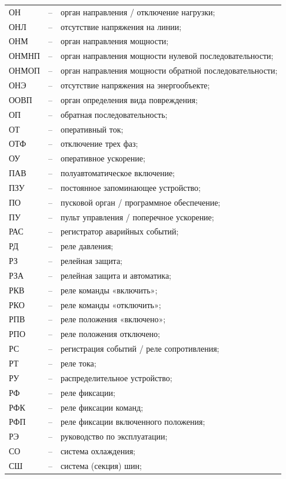 \begin{longtable}{>{\raggedright\arraybackslash}m{2cm}>{\raggedright\arraybackslash}m{0.5cm}>{\raggedright\arraybackslash}m{20cm}}
ОН & -- & орган направления / отключение нагрузки; \\
ОНЛ & -- & отсутствие напряжения на линии; \\
ОНМ & -- & орган направления мощности; \\
ОНМНП & -- & орган направления мощности нулевой последовательности; \\
ОНМОП & -- & орган направления мощности обратной последовательности; \\
ОНЭ & -- & отсутствие напряжения на энергообъекте; \\
ООВП & -- & орган определения вида повреждения; \\
ОП & -- & обратная последовательность; \\
ОТ & -- & оперативный ток; \\
ОТФ & -- & отключение трех фаз; \\
ОУ & -- & оперативное ускорение; \\
ПАВ & -- & полуавтоматическое включение; \\
ПЗУ & -- & постоянное запоминающее устройство; \\
ПО & -- & пусковой орган / программное обеспечение; \\
ПУ & -- & пульт управления / поперечное ускорение; \\
РАС & -- & регистратор аварийных событий; \\
РД & -- & реле давления; \\
РЗ & -- & релейная защита; \\
РЗА & -- & релейная защита и автоматика; \\
РКВ & -- & реле команды «включить»; \\
РКО & -- & реле команды «отключить»; \\
РПВ & -- & реле положения «включено»; \\
РПО & -- & реле положения отключено; \\
РС & -- & регистрация событий / реле сопротивления; \\
РТ & -- & реле тока; \\
РУ & -- & распределительное устройство; \\
РФ & -- & реле фиксации; \\
РФК & -- & реле фиксации команд; \\
РФП & -- & реле фиксации включенного положения; \\
РЭ & -- & руководство по эксплуатации; \\
СО & -- & система охлаждения; \\
СШ & -- & система (секция) шин; \\

\end{longtable}
